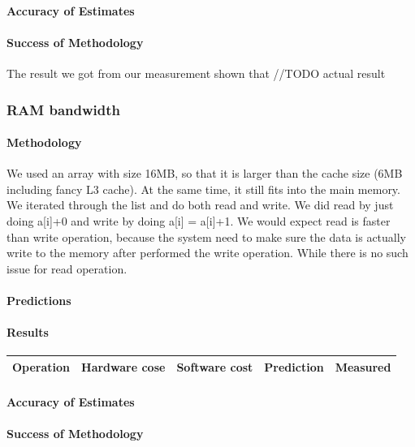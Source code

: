 \paragraph{Accuracy of Estimates}
\paragraph{Success of Methodology}

The result we got from our measurement shown that //TODO actual result






\subsubsection{RAM bandwidth}
\paragraph{Methodology}

We used an array with size 16MB, so that it is larger than the cache size (6MB including fancy L3 cache). At the same time, it still fits into the main memory. We iterated through the list and do both read and write. We did read by just doing a[i]+0 and write by doing a[i] = a[i]+1. We would expect read is faster than write operation, because the system need to make sure the data is actually write to the memory after performed the write operation. While there is no such issue for read operation.
\paragraph{Predictions}
\paragraph{Results}

\begin{center}
\begin{tabular}{| l | l | l | l | l |}
\hline
Operation & Hardware cose & Software cost & Prediction & Measured \\
\hline
\end{tabular}
\end{center}

\paragraph{Accuracy of Estimates}
\paragraph{Success of Methodology}





